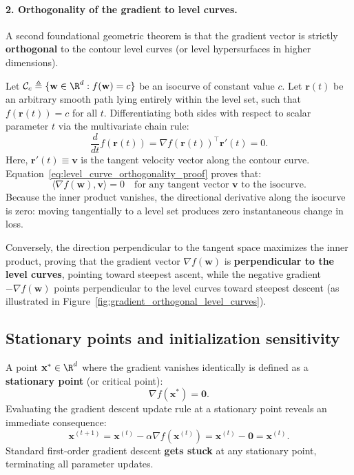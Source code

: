 \paragraph{2. Orthogonality of the gradient to level curves.}
A second foundational geometric theorem is that the gradient vector is strictly \textbf{orthogonal} to the contour level curves (or level hypersurfaces in higher dimensions).

Let $\mathcal{C}_c \triangleq \{ \mathbf{w} \in \R^d : f(\mathbf{w}) = c \}$ be an isocurve of constant value $c$. Let $\mathbf{r}(t)$ be an arbitrary smooth path lying entirely within the level set, such that $f(\mathbf{r}(t)) = c$ for all $t$. Differentiating both sides with respect to scalar parameter $t$ via the multivariate chain rule:
\begin{equation}
\frac{d}{dt} f(\mathbf{r}(t)) = \nabla f(\mathbf{r}(t))^\top \mathbf{r}'(t) = 0.
\label{eq:level_curve_orthogonality_proof}
\end{equation}
Here, $\mathbf{r}'(t) \equiv \mathbf{v}$ is the tangent velocity vector along the contour curve. Equation~\eqref{eq:level_curve_orthogonality_proof} proves that:
\begin{equation}
\langle \nabla f(\mathbf{w}), \mathbf{v} \rangle = 0 \quad \text{for any tangent vector } \mathbf{v} \text{ to the isocurve}.
\end{equation}
Because the inner product vanishes, the directional derivative along the isocurve is zero: moving tangentially to a level set produces zero instantaneous change in loss. 

Conversely, the direction perpendicular to the tangent space maximizes the inner product, proving that the gradient vector $\nabla f(\mathbf{w})$ is \textbf{perpendicular to the level curves}, pointing toward steepest ascent, while the negative gradient $-\nabla f(\mathbf{w})$ points perpendicular to the level curves toward steepest descent (as illustrated in Figure~\ref{fig:gradient_orthogonal_level_curves}).

\subsection{Stationary points and initialization sensitivity}
\label{sec:stationary_points_initialization}

A point $\mathbf{x}^* \in \R^d$ where the gradient vanishes identically is defined as a \textbf{stationary point} (or critical point):
\begin{equation}
\nabla f(\mathbf{x}^*) = \mathbf{0}.
\label{eq:stationary_point_def}
\end{equation}
Evaluating the gradient descent update rule at a stationary point reveals an immediate consequence:
\begin{equation}
\mathbf{x}^{(t+1)} = \mathbf{x}^{(t)} - \alpha \nabla f(\mathbf{x}^{(t)}) = \mathbf{x}^{(t)} - \mathbf{0} = \mathbf{x}^{(t)}.
\end{equation}
Standard first-order gradient descent \textbf{gets stuck} at any stationary point, terminating all parameter updates.

